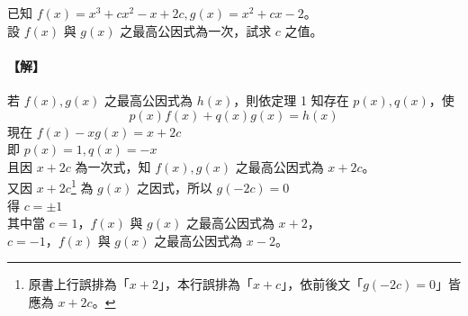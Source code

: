 \begin{example}\label{ex:7-1-6}
已知 $f(x) = x^3+cx^2-x+2c, g(x) = x^2+cx-2$。\\
設 $f(x)$ 與 $g(x)$ 之最高公因式為一次，試求 $c$ 之值。

\paragraph{【解】}
若 $f(x), g(x)$ 之最高公因式為 $h(x)$，則依定理 1 知存在 $p(x), q(x)$，使
\begin{equation*}
  p(x)f(x)+q(x)g(x) = h(x)
\end{equation*}
現在 $f(x)-xg(x) = x+2c$\\
即 $p(x) = 1, q(x) = -x$\\
且因 $x+2c$ 為一次式，知 $f(x), g(x)$ 之最高公因式為 $x+2c$。\\
又因 $x+2c$\footnote{原書上行誤排為「$x+2$」，本行誤排為「$x+c$」，依前後文「$g(-2c)=0$」皆應為 $x+2c$。} 為 $g(x)$ 之因式，所以 $g(-2c) = 0$\\
得 $c = \pm 1$\\
其中當 $c=1$，$f(x)$ 與 $g(x)$ 之最高公因式為 $x+2$，\\
$c=-1$，$f(x)$ 與 $g(x)$ 之最高公因式為 $x-2$。
\end{example}

